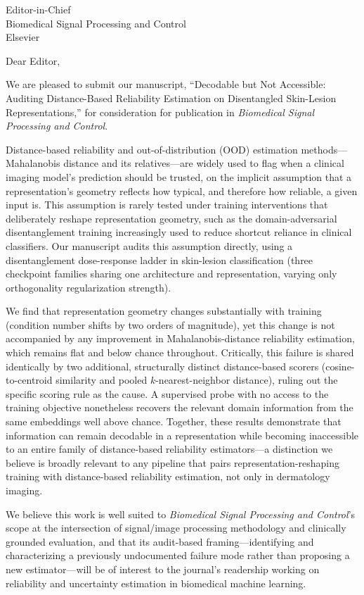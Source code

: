 \documentclass{letter}
\begin{document}
\begin{letter}{Editor-in-Chief\\Biomedical Signal Processing and Control\\Elsevier}

\opening{Dear Editor,}

We are pleased to submit our manuscript, ``Decodable but Not Accessible: Auditing Distance-Based Reliability Estimation on Disentangled Skin-Lesion Representations,'' for consideration for publication in \textit{Biomedical Signal Processing and Control}.

Distance-based reliability and out-of-distribution (OOD) estimation methods---Mahalanobis distance and its relatives---are widely used to flag when a clinical imaging model's prediction should be trusted, on the implicit assumption that a representation's geometry reflects how typical, and therefore how reliable, a given input is. This assumption is rarely tested under training interventions that deliberately reshape representation geometry, such as the domain-adversarial disentanglement training increasingly used to reduce shortcut reliance in clinical classifiers. Our manuscript audits this assumption directly, using a disentanglement dose-response ladder in skin-lesion classification (three checkpoint families sharing one architecture and representation, varying only orthogonality regularization strength).

We find that representation geometry changes substantially with training (condition number shifts by two orders of magnitude), yet this change is not accompanied by any improvement in Mahalanobis-distance reliability estimation, which remains flat and below chance throughout. Critically, this failure is shared identically by two additional, structurally distinct distance-based scorers (cosine-to-centroid similarity and pooled $k$-nearest-neighbor distance), ruling out the specific scoring rule as the cause. A supervised probe with no access to the training objective nonetheless recovers the relevant domain information from the same embeddings well above chance. Together, these results demonstrate that information can remain decodable in a representation while becoming inaccessible to an entire family of distance-based reliability estimators---a distinction we believe is broadly relevant to any pipeline that pairs representation-reshaping training with distance-based reliability estimation, not only in dermatology imaging.

We believe this work is well suited to \textit{Biomedical Signal Processing and Control}'s scope at the intersection of signal/image processing methodology and clinically grounded evaluation, and that its audit-based framing---identifying and characterizing a previously undocumented failure mode rather than proposing a new estimator---will be of interest to the journal's readership working on reliability and uncertainty estimation in biomedical machine learning.


\end{letter}
\end{document}
